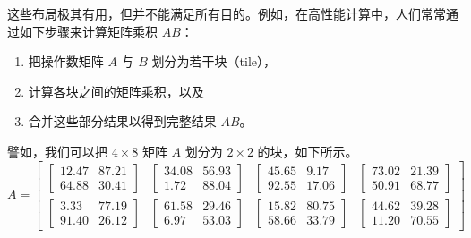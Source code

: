\noindent 这些布局极其有用，但并不能满足所有目的。例如，在高性能计算中，人们常常通过如下步骤来计算矩阵乘积 $AB$：
\begin{enumerate}
    \item 把操作数矩阵 $A$ 与 $B$ 划分为若干块（tile），
    \item 计算各块之间的矩阵乘积，以及
    \item 合并这些部分结果以得到完整结果 $AB$。
\end{enumerate}
譬如，我们可以把 $4 \times 8$ 矩阵 $A$ 划分为 $2 \times 2$ 的块，如下所示。
\[
A = \left[\begin{array}{cccc}
\begin{bmatrix}
12.47 & 87.21 \\
64.88 & 30.41 
\end{bmatrix}
&
\begin{bmatrix} 
34.08 & 56.93 \\
1.72 & 88.04 
\end{bmatrix}
&
\begin{bmatrix}
45.65 &  9.17 \\
92.55 & 17.06
\end{bmatrix}
&
\begin{bmatrix} 
73.02 & 21.39 \\
50.91 & 68.77
\end{bmatrix} 
\\[2ex]
\begin{bmatrix}
 3.33 & 77.19 \\
 91.40 & 26.12
\end{bmatrix} 
&
\begin{bmatrix} 
 61.58 & 29.46 \\
6.97 & 53.03 
\end{bmatrix}
&
\begin{bmatrix} 
 15.82 & 80.75 \\
58.66 & 33.79
\end{bmatrix} 
&
\begin{bmatrix} 
 44.62 & 39.28 \\
11.20 & 70.55
\end{bmatrix} 
\end{array}\right]
\]

